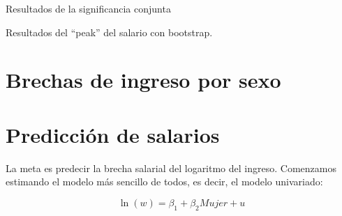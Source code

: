 \documentclass[
  11pt,
  letterpaper,
]{article}
\begin{document}
Resultados de la significancia conjunta

Resultados del ``peak'' del salario con bootstrap.

\hypertarget{brechas-de-ingreso-por-sexo}{%
\section{Brechas de ingreso por
sexo}\label{brechas-de-ingreso-por-sexo}}

\hypertarget{predicciuxf3n-de-salarios}{%
\section{Predicción de salarios}\label{predicciuxf3n-de-salarios}}

La meta es predecir la brecha salarial del logaritmo del ingreso.
Comenzamos estimando el modelo más sencillo de todos, es decir, el
modelo univariado:

\begin{equation}
\ln (w) = \beta_1 + \beta_2 Mujer+u
  \label{gap0}
\end{equation}
\end{document}
